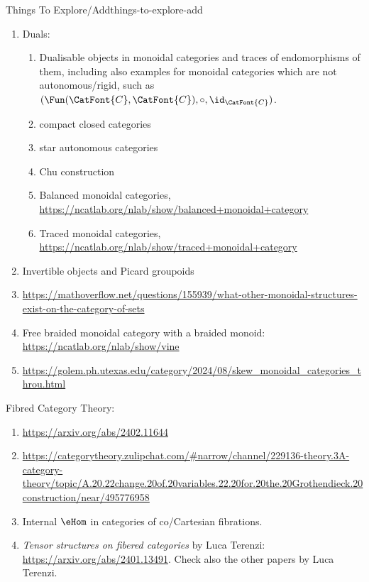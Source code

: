 \begin{remark}{Things To Explore/Add}{things-to-explore-add}
\begin{enumerate}
            \[
                (X\xrightarrow{f}A)\oplus(X\xrightarrow{g}B)%
                \defeq%
                [%
                    X%
                    \to%
                    X\icoprod X%
                    \xrightarrow{f\icoprod g}%
                    A\icoprod B%
                ]%
            \]%
        \item Duals:
            \begin{enumerate}
                \item Dualisable objects in monoidal categories and traces of endomorphisms of them, including also examples for monoidal categories which are not autonomous/rigid, such as $(\Fun(\CatFont{C},\CatFont{C}),\circ,\id_{\CatFont{C}})$.
                \item compact closed categories
                \item star autonomous categories
                \item Chu construction
                \item Balanced monoidal categories, \url{https://ncatlab.org/nlab/show/balanced+monoidal+category}
                \item Traced monoidal categories, \url{https://ncatlab.org/nlab/show/traced+monoidal+category}
            \end{enumerate}
        \item Invertible objects and Picard groupoids
        \item \url{https://mathoverflow.net/questions/155939/what-other-monoidal-structures-exist-on-the-category-of-sets}
        \item Free braided monoidal category with a braided monoid: \url{https://ncatlab.org/nlab/show/vine}
        \item \url{https://golem.ph.utexas.edu/category/2024/08/skew_monoidal_categories_throu.html}
    \end{enumerate}
    Fibred Category Theory:
    \begin{enumerate}
        \item \url{https://arxiv.org/abs/2402.11644}
        \item \url{https://categorytheory.zulipchat.com/#narrow/channel/229136-theory.3A-category-theory/topic/A.20.22change.20of.20variables.22.20for.20the.20Grothendieck.20construction/near/495776958}
        \item Internal $\eHom$ in categories of co/Cartesian fibrations.
        \item \textit{Tensor structures on fibered categories} by Luca Terenzi: \url{https://arxiv.org/abs/2401.13491}. Check also the other papers by Luca Terenzi.

\end{enumerate}
\end{remark}
